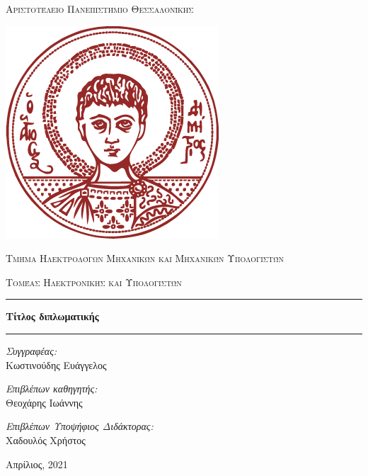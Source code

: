 \documentclass[a4paper,12pt]{article}
\newcommand{\HRule}{\rule{\linewidth}{0.5mm}}
\begin{document}
\begin{titlepage}

\center
 
\textsc{\LARGE Αριστοτέλειο Πανεπιστήμιο Θεσσαλονίκης}


\includegraphics[scale=.3]{LogoAUTH72ppi.png}

\textsc{\Large Τμήμα Ηλεκτρολόγων Μηχανικών και Μηχανικών Υπολογιστών}
\vspace{0.5cm}

\textsc{\large Τομέας Ηλεκτρονικής και Υπολογιστών}
\vspace{0.5cm}

\HRule
\vspace{0.4cm}
{ \huge \bfseries Τίτλος διπλωματικής}
\vspace{0.4cm}
\HRule
\vspace{1cm}

\begin{minipage}{0.8\textwidth}
    \center
    \large
    \emph{Συγγραφέας:} \\ 
    \Large
    Κωστινούδης Ευάγγελος
\end{minipage}
\vspace{0.5cm}

\begin{minipage}{0.8\textwidth}
    \center
    \large
    \emph{Επιβλέπων καθηγητής:} \\ 
    \Large
    Θεοχάρης Ιωάννης \\
\end{minipage}
\vspace{0.5cm}

\begin{minipage}{0.8\textwidth}
    \center
    \large
    \emph{Επιβλέπων Υποψήφιος Διδάκτορας:} \\ 
    \Large
    Χαδουλός Χρήστος
\end{minipage}
\vspace{0.5cm}

\vspace*{\fill}

{\large Απρίλιος, 2021}

\end{titlepage}
\end{document}
